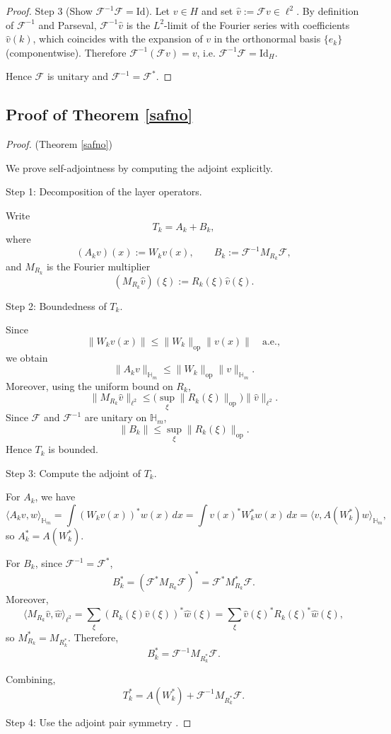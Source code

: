 \documentclass{article}
\theoremstyle{plain}
\theoremstyle{definition}
\theoremstyle{remark}
\newcommand{\inner}[2]{\langle #1, #2 \rangle}
\newcommand{\F}{\mathcal{F}}
\newcommand{\Finve}{\mathcal{F}^{-1}}
\newcommand{\Hm}{\mathbb{H}_m}
\newcommand{\op}{\mathrm{op}}
\begin{document}
\begin{proof}
Step 3 (Show $\Finve\F=\mathrm{Id}$).
Let $v\in H$ and set $\hat v:=\F v\in \ell^2$.
By definition of $\Finve$ and Parseval, $\Finve \hat v$ is the $L^2$-limit of the Fourier series
with coefficients $\hat v(k)$, which coincides with the expansion of $v$ in the orthonormal basis
$\{e_k\}$ (componentwise). Therefore $\Finve(\F v)=v$, i.e. $\Finve\F=\mathrm{Id}_{H}$.

Hence $\F$ is unitary and $\Finve=\F^*$.
\end{proof}





\subsection{Proof of Theorem \ref{safno}}
\begin{proof}(Theorem \ref{safno})

We prove self-adjointness by computing the adjoint explicitly.

Step 1: Decomposition of the layer operators.

Write
\[
T_k = A_k + B_k,
\]
where
\[
(A_k v)(x) := W_k v(x),
\qquad
B_k := \Finve M_{R_k}\F,
\]
and $M_{R_k}$ is the Fourier multiplier
\[
(M_{R_k}\hat v)(\xi) := R_k(\xi)\hat v(\xi).
\]

Step 2: Boundedness of $T_k$.

Since
\[
\|W_k v(x)\| \le \|W_k\|_{\op}\|v(x)\|
\quad\text{a.e.},
\]
we obtain
\[
\|A_k v\|_{\Hm} \le \|W_k\|_{\op}\|v\|_{\Hm}.
\]
Moreover, using the uniform bound on $R_k$,
\[
\|M_{R_k}\hat v\|_{\ell^2}
\le \Big(\sup_{\xi}\|R_k(\xi)\|_{\op}\Big)\|\hat v\|_{\ell^2}.
\]
Since $\F$ and $\Finve$ are unitary on $\Hm$,
\[
\|B_k\| \le \sup_{\xi}\|R_k(\xi)\|_{\op}.
\]
Hence $T_k$ is bounded.

Step 3: Compute the adjoint of $T_k$.

For $A_k$, we have
\[
\inner{A_k v}{w}_{\Hm}
= \int (W_k v(x))^* w(x)\,dx
= \int v(x)^* W_k^* w(x)\,dx
= \inner{v}{A(W_k^*) w}_{\Hm},
\]
so $A_k^* = A(W_k^*)$.

For $B_k$, since $\Finve=\F^*$,
\[
B_k^* = (\F^* M_{R_k}\F)^* = \F^* M_{R_k}^* \F.
\]
Moreover,
\[
\inner{M_{R_k}\hat v}{\hat w}_{\ell^2}
= \sum_\xi (R_k(\xi)\hat v(\xi))^* \hat w(\xi)
= \sum_\xi \hat v(\xi)^* R_k(\xi)^* \hat w(\xi),
\]
so $M_{R_k}^* = M_{R_k^*}$.
Therefore,
\[
B_k^* = \Finve M_{R_k^*}\F.
\]

Combining,
\[
T_k^* = A(W_k^*) + \Finve M_{R_k^*}\F.
\]

Step 4: Use the adjoint pair symmetry .


\end{proof}
\end{document}
